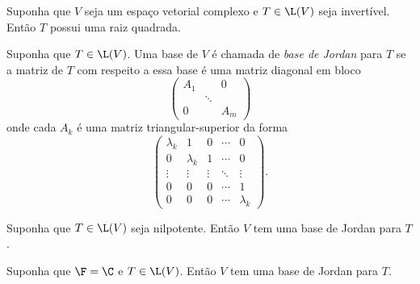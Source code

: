 \documentclass{article}
\begin{document}
\begin{prop} 
    Suponha que \(V\) seja um espaço vetorial complexo e \(T \in \L(V)\) seja invertível. Então \(T\) possui uma raiz quadrada.
\end{prop}

\begin{defn}
    Suponha que \(T \in \L(V)\). Uma base de \(V\) é chamada de \emph{base de Jordan} para \(T\) se a matriz de \(T\) com respeito a essa base é uma matriz diagonal em bloco 
    \[
        \begin{pmatrix*}
            A_1 & & 0 \\
            & \ddots & \\
            0 & & A_m
        \end{pmatrix*}
    \]
    \noindent onde cada \(A_k\) é uma matriz triangular-superior da forma 
    \[
        \begin{pmatrix*}
            \lambda_k & 1 & 0 & \cdots & 0 \\
            0 & \lambda_k & 1 & \cdots & 0 \\
            \vdots & \vdots & \vdots & \ddots & \vdots \\
            0 & 0 & 0 & \cdots & 1 \\
            0 & 0 & 0 & \cdots & \lambda_k
        \end{pmatrix*}.
    \]
\end{defn}

\begin{prop}
    Suponha que \(T \in \L(V)\) seja nilpotente. Então \(V\) tem uma base de Jordan para \(T\).
\end{prop}

\begin{prop}
    Suponha que \(\F = \C\) e \(T \in \L(V)\). Então \(V\) tem uma base de Jordan para \(T\).
\end{prop}
\end{document}
